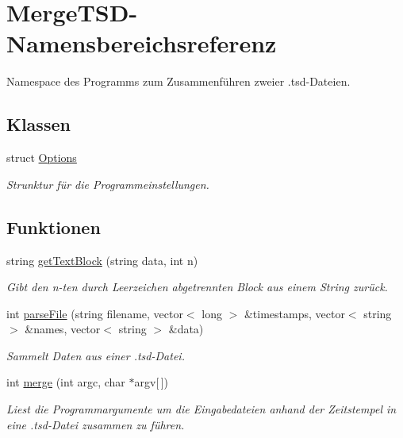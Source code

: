 \hypertarget{namespaceMergeTSD}{\section{Merge\-T\-S\-D-\/\-Namensbereichsreferenz}
\label{namespaceMergeTSD}
}


Namespace des Programms zum Zusammenführen zweier .tsd-\/\-Dateien.  


\subsection*{Klassen}
\begin{DoxyCompactItemize}
\item 
struct \hyperlink{structMergeTSD_1_1Options}{Options}
\begin{DoxyCompactList}\small\item\em Strunktur für die Programmeinstellungen. \end{DoxyCompactList}\end{DoxyCompactItemize}
\subsection*{Funktionen}
\begin{DoxyCompactItemize}
\item 
string \hyperlink{namespaceMergeTSD_a3e10ba5891c92ec49480c12330f7d87c}{get\-Text\-Block} (string data, int n)
\begin{DoxyCompactList}\small\item\em Gibt den n-\/ten durch Leerzeichen abgetrennten Block aus einem String zurück. \end{DoxyCompactList}\item 
int \hyperlink{namespaceMergeTSD_ad380b92e7e702006d21b99bf6ebbe5cf}{parse\-File} (string filename, vector$<$ long $>$ \&timestamps, vector$<$ string $>$ \&names, vector$<$ string $>$ \&data)
\begin{DoxyCompactList}\small\item\em Sammelt Daten aus einer .tsd-\/\-Datei. \end{DoxyCompactList}\item 
int \hyperlink{namespaceMergeTSD_a77cf0d82e2e5257abde3e667be3299f5}{merge} (int argc, char $\ast$argv\mbox{[}$\,$\mbox{]})
\begin{DoxyCompactList}\small\item\em Liest die Programmargumente um die Eingabedateien anhand der Zeitstempel in eine .tsd-\/\-Datei zusammen zu führen. \end{DoxyCompactList}\end{DoxyCompactItemize}
